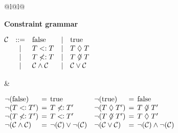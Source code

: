 \begin{figure}[t]
\small
\begin{tabular}{@{}l@{}l@{}}
\begin{minipage}[t]{.4\textwidth}
\textbf{Constraint grammar} \par
\smallskip
\noindent\(
\begin{array}{@{}lclcl@{}}
\C &::=& \FALSE &\mid& \TRUE \\
  &\mid& T <: T &\mid& T \exc T \\
  &\mid& T \not<: T &\mid& T \nexc T \\
  &\mid& \C \wedge \C &\mid& \C \vee \C \\
  \end{array}
\)
\end{minipage}
&
\hspace*{-1em}
\begin{minipage}[t]{0.6\textwidth}
\noindent\(
\begin{array}{@{}l@{\hspace{1ex}}c@{\hspace{1ex}}ll@{\hspace{1ex}}c@{\hspace{1ex}}l@{}}
\neg(\FALSE) &=& \TRUE & \neg(\TRUE) &=& \FALSE \\
\neg(T \subtypeof T') &=& T \nsubtypeof T' & \neg(T \exc T') &=& T \nexc T'\\
\neg(T \nsubtypeof T') &=& T \subtypeof T' & \neg(T \nexc T') &=& T \exc T' \\
\neg(\C \wedge \C) &=& \neg(\C) \vee \neg(\C) & \neg(\C \vee \C) &=& \neg(\C) \wedge \neg(\C) \\
\end{array}
\)
\end{minipage}\\

\begin{minipage}[t]{0.5\textwidth}

\infrule
  { \jsub{\alpha}{\eta}{\C} }
  { \jnsub{\alpha}{\eta}{\neg\C} }


\infrule
  { \jsub{\alpha}{\eta}{\C} \andalso {} }
  {  }


\end{minipage}
\end{tabular}
\end{figure}
